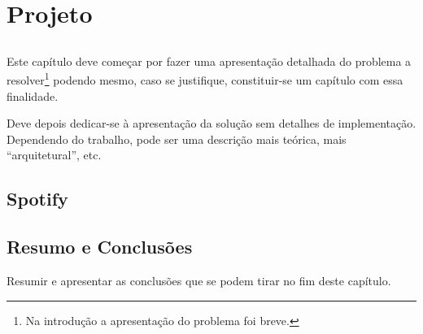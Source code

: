 
\chapter{Projeto}\label{chap:chap3}

\section*{}

Este capítulo deve começar por fazer uma apresentação detalhada do
problema a resolver\footnote{Na introdução a apresentação do
  problema foi breve.} podendo mesmo, caso se justifique,
constituir-se um capítulo com essa finalidade.

Deve depois dedicar-se à apresentação da solução sem detalhes de
implementação. 
Dependendo do trabalho, pode ser uma descrição mais teórica, mais
``arquitetural'', etc.

\section{Spotify} %
\label{sec:spotify}

\lipsum


\section{Resumo e Conclusões}

Resumir e apresentar as conclusões que se podem tirar no fim deste
capítulo.
